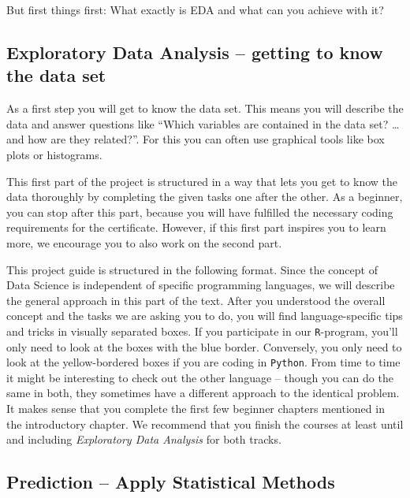 \documentclass[
  11pt,
]{article}
\begin{document}
But first things first: What exactly is EDA and what can you achieve with it?

\hypertarget{exploratory-data-analysis-getting-to-know-the-data-set}{%
\subsection{Exploratory Data Analysis -- getting to know the data set}\label{exploratory-data-analysis-getting-to-know-the-data-set}}

As a first step you will get to know the data set. This means you will describe the data and answer questions like ``Which variables are contained in the data set? \ldots and how are they related?''. For this you can often use graphical tools like box plots or histograms.

This first part of the project is structured in a way that lets you get to know the data thoroughly by completing the given tasks one after the other. As a beginner, you can stop after this part, because you will have fulfilled the necessary coding requirements for the certificate. However, if this first part inspires you to learn more, we encourage you to also work on the second part.

This project guide is structured in the following format. Since the concept of Data Science is independent of specific programming languages, we will describe the general approach in this part of the text. After you understood the overall concept and the tasks we are asking you to do, you will find language-specific tips and tricks in visually separated boxes. If you participate in our \texttt{R}-program, you'll only need to look at the boxes with the blue border. Conversely, you only need to look at the yellow-bordered boxes if you are coding in \texttt{Python}. From time to time it might be interesting to check out the other language -- though you can do the same in both, they sometimes have a different approach to the identical problem. It makes sense that you complete the first few beginner chapters mentioned in the introductory chapter. We recommend that you finish the courses at least until and including \emph{Exploratory Data Analysis} for both tracks.

\hypertarget{prediction-apply-statistical-methods}{%
\subsection{Prediction -- Apply Statistical Methods}\label{prediction-apply-statistical-methods}}
\end{document}
